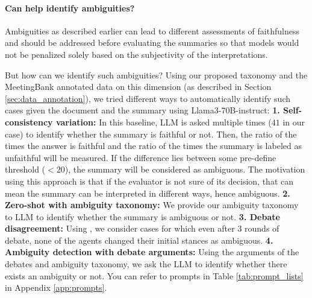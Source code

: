 \paragraph{Can \method help identify ambiguities?}
Ambiguities as described earlier can lead to different assessments of faithfulness and should be addressed before evaluating the summaries so that models would not be penalized solely based on the subjectivity of the interpretations. 



But how can we identify such ambiguities? Using our proposed taxonomy and the MeetingBank annotated data on this dimension (as described in Section \ref{sec:data_annotation}), we tried different ways to automatically identify such cases given the document and the summary using Llama3-70B-instruct:
\textbf{1. Self-consistency variation:} 
In this baseline, LLM is asked multiple times ($41$ in our case) to identify whether the summary is faithful or not. Then, the ratio of the times the answer is faithful and the ratio of the times the summary is labeled as unfaithful will be measured. If the difference lies between some pre-define threshold ($<20$), the summary will be considered as ambiguous. The motivation using this approach is that if the evaluator is not sure of its decision, that can mean the summary can be interpreted in different ways, hence ambiguous.
\textbf{2. Zero-shot with ambiguity taxonomy:}
We provide our ambiguity taxonomy to LLM to identify whether the summary is ambiguous or not.
\textbf{3. Debate disagreement:}
Using \method, we consider cases for which even after $3$ rounds of debate, none of the agents changed their initial stances as ambiguous.
\textbf{4. Ambiguity detection with debate arguments:}
Using the arguments of the debates and ambiguity taxonomy, we ask the LLM to identify whether there exists an ambiguity or not. You can refer to prompts in Table \ref{tab:prompt_lists} in Appendix \ref{app:prompts}.

